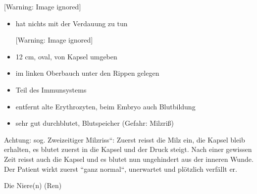 \documentclass{article}
\begin{document}
\begin{center}
 [Warning: Image ignored] %

\end{center}
\begin{itemize}
\item hat nichts  mit der Verdauung  zu tun 

\begin{center}
 [Warning: Image ignored] %

\end{center}
\item 12 cm, oval, von Kapsel  umgeben

\item im linken Oberbauch unter den Rippen gelegen

\item Teil des Immunsystems

\item entfernt alte Erythrozyten, beim Embryo auch Blut\-bildung

\item sehr gut durchblutet, Blutspeicher (Gefahr:
Milzri{\ss})

\end{itemize}
Achtung: sog. {\quotedblbase}Zweizeitiger
Milzriss{\textquotedblleft}: Zuerst reisst die Milz ein, die Kapsel
bleib erhalten, es blutet zuerst in die Kapsel und der Druck steigt.
Nach einer gewissen Zeit reisst auch die Kapsel und es blutet nun
ungehindert aus der inneren Wunde. Der Patient wirkt zuerst
{\textquotedblleft}ganz normal{\textquotedblleft}, unerwartet und
pl\"otzlich verf\"allt er. 

Die Niere(n) (Ren)
\end{document}
